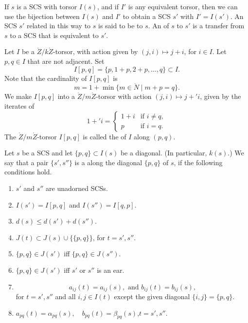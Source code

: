 \begin{definition}
If $s$ is a SCS with torsor $I(s)$, and if
$I'$ is any equivalent torsor, then we can use the bijection between $I(s)$ and $I'$
to obtain a SCS $s'$ with $I' = I(s')$.  An
SCS $s'$ related in this way to $s$ is said
to be  to $s$.  An  of $s$
to $s'$ is a transfer from $s$ to a SCS that
is equivalent to $s'$.
\end{definition}

\begin{definition}[slice] 
Let $I$ be a $\ring{Z}/k\ring{Z}$-torsor, with action given by $(j,i)\mapsto j+i$,
for $i\in I$.  Let $p,q\in I$ that are not adjacent.  Set
\[
I[p,q] = \{p,1+p,2+p,\ldots,q\} \subset I.
\]
Note that the cardinality of $I[p,q]$ is
\[
m = 1 + \min \{m\in \ring{N} \mid m + p = q\}.
\]
We make $I[p,q]$ into a $\ring{Z}/m\ring{Z}$-torsor with action $(j,i)\mapsto j+' i$,
given by the iterates of
\[
1 +' i = 
\begin{cases}
  1 + i &\text{if } i\ne q,\\
  p &\text{if } i = q.
\end{cases}
\]
The $\ring{Z}/m\ring{Z}$-torsor $I[p,q]$ is called the
 of $I$ along $(p,q)$.
%
\end{definition}

\figWKUYEXM %


\begin{definition}[slice]
 Let $s$ be a SCS and let $\{p,q\}\subset I(s)$ be a diagonal.
  (In particular, $k(s)$.)  We
  say that a pair $\{s',s''\}$ is a
 along  the
  diagonal $\{p,q\}$ of $s$, if the following conditions hold.
\begin{enumerate}
\item $s'$ and $s''$ are unadorned SCSs.
\item $I(s')=I[p,q]$ and $I(s'') = I[q,p]$.
\item $d(s) \le d(s') + d(s'')$.
\item $J(t) \subset J(s) \cup \{\{p,q\}\}$, for $t = s',s''$.  
\item $\{p,q\}\in J(s')$ iff $\{p,q\}\in J(s'')$.
\item $\{p,q\}\in J(s')$ iff $s'$ or $s''$ is an ear.
\item 
\[
a_{ij}(t) = a_{ij}(s), \text{ and } b_{ij}(t) = b_{ij}(s),
\]
for  $t=s',s''$ and all $i,j\in I(t)$ except the given diagonal $\{i,j\} = \{p,q\}$.
\item $a_{pq}(t) = \alpha_{pq}(s),\quad b_{pq}(t)=\beta_{pq}(s)$,\quad $t = s',s''$.
\end{enumerate}
\end{definition}



